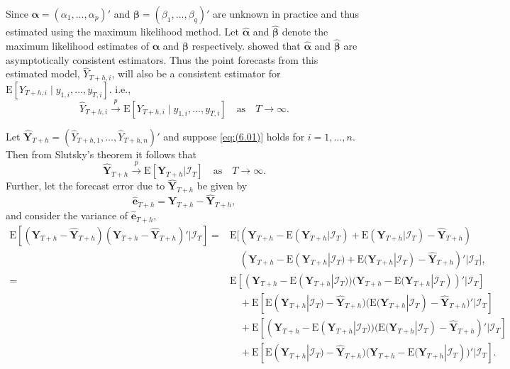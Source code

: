 \documentclass[a4paper, 11pt]{article}
\def\E{\text{E}}
\begin{document}
Since $\bm{\alpha} = (\alpha_1,\dots,\alpha_p)'$ and $\bm{\beta} = (\beta_1,\dots,\beta_q)'$ are unknown in practice and thus estimated using the maximum likelihood method. Let $\bm{\hat{\alpha}}$ and $\bm{\hat{\beta}}$ denote the maximum likelihood estimates of $\bm{\alpha}$ and $\bm{\beta}$ respectively. \citet{Yao2006} showed that $\bm{\hat{\alpha}}$ and $\bm{\hat{\beta}}$ are asymptotically consistent estimators. Thus the point forecasts from this estimated model, $\hat{Y}_{T+h,i}$, will also be a consistent estimator for $\E[Y_{T+h,i}\mid y_{1,i},\dots,y_{T,i}]$. i.e.,
\begin{equation} \label{eq:(6.01)}
\hat{Y}_{T+h,i} \overset{p}{\to} \E[Y_{T+h,i}\mid y_{1,i},\dots,y_{T,i}] \quad \text{as} \quad T \to \infty.
\end{equation}

Let $\hat{\bm{Y}}_{T+h}=(\hat{Y}_{T+h,1},\dots,\hat{Y}_{T+h,n})'$ and suppose \eqref{eq:(6.01)} holds for $i=1,\dots,n$. Then from Slutsky's theorem it follows that
\begin{equation}\label{eq:(6.02)}
\hat{\bm{Y}}_{T+h} \overset{p}{\to} \E[\bm{Y}_{T+h}|\bm{\mathcal{I}}_T] \quad \text{as} \quad T \to \infty.
\end{equation}
Further, let the forecast error due to $\hat{\bm{Y}}_{T+h}$ be given by
\begin{equation}
\hat{\bm{e}}_{T+h} = \bm{Y}_{T+h}-\hat{\bm{Y}}_{T+h},
\end{equation}
and consider the variance of $\hat{\bm{e}}_{T+h}$,
\begin{align*}
\E[(\bm{Y}_{T+h} - \hat{\bm{Y}}_{T+h})(\bm{Y}_{T+h} - \hat{\bm{Y}}_{T+h})'|\bm{\mathcal{I}}_T] = &
\E[(\bm{Y}_{T+h} - \E(\bm{Y}_{T+h}|\bm{\mathcal{I}}_T) + \E(\bm{Y}_{T+h}|\bm{\mathcal{I}}_T)- \hat{\bm{Y}}_{T+h})\\
& \quad
(\bm{Y}_{T+h} - \E(\bm{Y}_{T+h}|\bm{\mathcal{I}}_T) + \E(\bm{Y}_{T+h}|\bm{\mathcal{I}}_T) - \hat{\bm{Y}}_{T+h})'|\bm{\mathcal{I}}_T],\\
= &
\E[(\bm{Y}_{T+h} - \E(\bm{Y}_{T+h}|\bm{\mathcal{I}}_T))(\bm{Y}_{T+h} - \E(\bm{Y}_{T+h}|\bm{\mathcal{I}}_T))'|\bm{\mathcal{I}}_T]\\
& \quad
+ \E[\E(\bm{Y}_{T+h}|\bm{\mathcal{I}}_T) - \hat{\bm{Y}}_{T+h})(\E(\bm{Y}_{T+h}|\bm{\mathcal{I}}_T) - \hat{\bm{Y}}_{T+h})'|\bm{\mathcal{I}}_T]\\
& \quad
+  \E[(\bm{Y}_{T+h} - \E(\bm{Y}_{T+h}|\bm{\mathcal{I}}_T))(\E(\bm{Y}_{T+h}|\bm{\mathcal{I}}_T) - \hat{\bm{Y}}_{T+h})'|\bm{\mathcal{I}}_T]\\
&  \quad
+ \E[\E(\bm{Y}_{T+h}|\bm{\mathcal{I}}_T) - \hat{\bm{Y}}_{T+h})(\bm{Y}_{T+h} - \E(\bm{Y}_{T+h}|\bm{\mathcal{I}}_T))'|\bm{\mathcal{I}}_T].
\end{align*}
\end{document}
